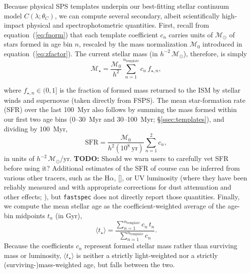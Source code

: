 \documentclass[modern,linenumbers]{aastex701}
\newcommand{\todo}[1]{{\color{red}\textbf{TODO:} #1}}
\newcommand{\fastspecfit}{\texttt{FastSpecFit}}
\newcommand{\fastspec}{\texttt{fastspec}}
\newcommand{\oii}{[\ion{O}{2}]}
\newcommand{\ha}{H\ensuremath{\alpha}}
\newcommand{\Mstar}{\ensuremath{\mathcal{M}_{\star}}}
\newcommand{\msun}{\ensuremath{\mathcal{M}_{\odot}}}
\begin{document}

Because physical SPS templates underpin our best-fitting stellar
continuum model $C(\lambda;\theta_C)$, we can compute several
secondary, albeit scientifically high-impact physical and
spectrophotometric quantities. First, recall from
equation~(\ref{eq:fnorm}) that each template coefficient $c_n$ carries
units of \msun{} of stars formed in age bin $n$, rescaled by the mass
normalization $\mathcal{M}_0$ introduced in
equation~(\ref{eq:zfactor}). The current stellar mass (in
$h^{-2}\,\msun$), therefore, is simply
\begin{equation}
  \Mstar = \frac{\mathcal{M}_0}{h^2}\sum_{n=1}^{n_\mathrm{template}} c_n\,f_{\star,n},
  \label{eq:mstar}
\end{equation}


\noindent where $f_{\star,n}\in(0,1]$ is the fraction of formed mass
  returned to the ISM by stellar winds and supernovae (taken directly
  from FSPS). The mean star-formation rate (SFR) over the last 100~Myr
  also follows by summing the mass formed within our first two age
  bins (0--30~Myr and 30--100~Myr; \S\ref{ssec:templates}), and
  dividing by 100~Myr,
\begin{equation}
  \mathrm{SFR} = \frac{\mathcal{M}_0}{h^{2}(10^{8}~\mathrm{yr})}\sum_{n=1}^{2} c_n,
  \label{eq:sfr}
\end{equation}
\noindent in units of $h^{-2}\,\msun$/yr.
\todo{Should we warn users to carefully vet SFR before using it?}
Additional estimates of the SFR of course can be inferred from various
other tracers, such as the \ha, \oii, or UV luminosity (where they
have been reliably measured and with appropriate corrections for dust
attenuation and other effects; \citealt{moustakas06b, kennicutt98a}),
but \fastspec{} does not directly report those quantities. Finally, we
compute the mean stellar age as the coefficient-weighted average of
the age-bin midpoints $t_n$ (in Gyr),
\begin{equation}
  \langle t_\star\rangle = \frac{\sum_{n=1}^{n_\mathrm{template}}
    c_n\,t_n}{\sum_{n=1}^{n_\mathrm{template}} c_n}.
  \label{eq:age}
\end{equation}
Because the coefficients $c_n$ represent formed stellar mass rather
than surviving mass or luminosity, $\langle t_\star\rangle$ is neither
a strictly light-weighted nor a strictly (surviving-)mass-weighted
age, but falls between the two.
\end{document}
